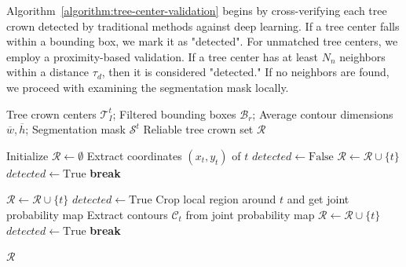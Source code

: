 \documentclass{article}
\begin{document}
Algorithm~\ref{algorithm:tree-center-validation} begins by cross-verifying each tree crown detected by traditional methods against deep learning. If a tree center falls within a bounding box, we mark it as "detected". For unmatched tree centers, we employ a proximity-based validation. If a tree center has at least $N_n$ neighbors within a distance $\tau_d$, then it is considered "detected." If no neighbors are found, we proceed with examining the segmentation mask locally. 

\begin{algorithm}[htbp]
\caption{Step 3: Tree center validation.}\label{algorithm:tree-center-validation}
\begin{algorithmic}[1]

\Require 
Tree crown centers $\mathcal{T}^t_I$; Filtered bounding boxes $\mathcal{B}_r$; Average contour dimensions $\overline{w}, \overline{h}$; Segmentation mask $\mathcal{S}^t$
\Ensure 
Reliable tree crown set $\mathcal{R}$

\State Initialize $\mathcal{R} \gets \emptyset$
    \State Extract coordinates $(x_t, y_t)$ of $t$
    \State $detected \gets \text{False}$
            \State $\mathcal{R} \gets \mathcal{R} \cup \{t\}$ 
            \State $detected \gets \text{True}$
            \State \textbf{break}
        \EndIf
    \EndFor

            \State $\mathcal{R} \gets \mathcal{R} \cup \{t\}$ 
            \State $detected \gets \text{True}$
        \Else
            \State Crop local region around $t$ and get joint probability map
            \State Extract contours $\mathcal{C}_t$ from joint probability map
                    \State $\mathcal{R} \gets \mathcal{R} \cup \{t\}$
                    \State $detected \gets \text{True}$
                    \State \textbf{break}
                \EndIf
            \EndFor
        \EndIf
    \EndIf
\EndFor

\State \Return $\mathcal{R}$

\end{algorithmic}
\end{algorithm}
\end{document}
